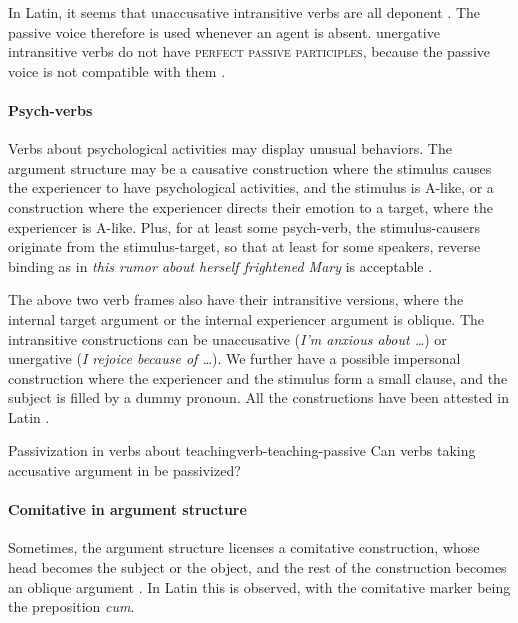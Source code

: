 \documentclass[a4paper, oneside, 12pt]{report}
\newcommand*{\citesec}[1]{\S~{#1}}
\newcommand*{\citepages}[1]{pp.~{#1}}
\newcommand{\form}[1]{\emph{#1}}
\newcommand*{\category}[1]{\textsc{#1}}
\begin{document}
In Latin, it seems that unaccusative intransitive verbs are all deponent
\citep[\citepages{308-309}]{oniga2014latin}.
The passive voice therefore is used whenever an agent is absent.
unergative intransitive verbs do not have \category{perfect passive participles},
because the passive voice is not compatible with them
\citep{giusti2019psychological}.



\paragraph*{Psych-verbs}
Verbs about psychological activities may display unusual behaviors.
The argument structure may be 
a causative construction where the stimulus causes the experiencer to have psychological activities,
and the stimulus is A-like,
or a construction where the experiencer directs their emotion to a target,
where the experiencer is A-like.
Plus, for at least some psych-verb, the stimulus-causers originate from the stimulus-target,
so that at least for some speakers,
reverse binding as in \form{this rumor about herself frightened Mary} is acceptable
\citep{hornstein2002psych}.

The above two verb frames also have their intransitive versions,
where the internal target argument or the internal experiencer argument is oblique.
The intransitive constructions can be unaccusative (\form{I'm anxious about \dots})
or unergative (\form{I rejoice because of \dots}).
We further have a possible impersonal construction where the experiencer and the stimulus
form a small clause,
and the subject is filled by a dummy pronoun.
All the constructions have been attested in Latin \citep{giusti2019psychological}.

\begin{todobox}{Passivization in verbs about teaching}{verb-teaching-passive}
    Can verbs taking accusative argument in \citep[\citesec{4.36}]{Pinkster1}
    be passivized?
\end{todobox}

\paragraph*{Comitative in argument structure}
\label{sec:grammatical.clause.core.comitative}
Sometimes, the argument structure licenses a comitative construction,
whose head becomes the subject or the object,
and the rest of the construction becomes an oblique argument \citep{zhang2007syntax}.
In Latin this is observed, with the comitative marker being the preposition \form{cum}.
\end{document}
